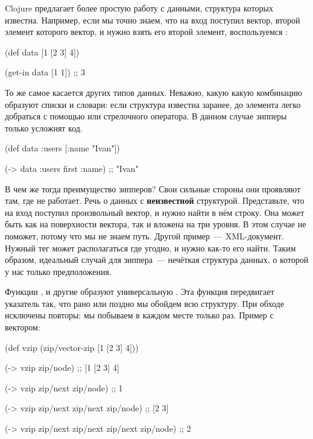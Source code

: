 Clojure предлагает более простую работу с данными, структура которых
известна. Например, если мы точно знаем, что на вход поступил вектор, второй
элемент которого вектор, и нужно взять его второй элемент, воспользуемся
:

\begin{english}
  \begin{clojure}
(def data [1 [2 3] 4])

(get-in data [1 1])
;; 3
  \end{clojure}
\end{english}

То же самое касается других типов данных. Неважно, какую какую комбинацию
образуют списки и словари: если структура известна заранее, до элемента легко
добраться с помощью  или стрелочного оператора. В данном случае зипперы
только усложнят код.

\begin{english}
  \begin{clojure}
(def data {:users [{:name "Ivan"}]})

(-> data :users first :name)
;; "Ivan"
  \end{clojure}
\end{english}

В чем же тогда преимущество зипперов? Свои сильные стороны они проявляют там,
где  не работает. Речь о данных с \textbf{неизвестной} структурой. Представьте,
что на вход поступил произвольный вектор, и нужно найти в нём строку. Она может
быть как на поверхности вектора, так и вложена на три уровня. В этом случае
 не поможет, потому что мы не знаем путь. Другой пример~---
XML-документ. Нужный тег может располагаться где угодно, и нужно как-то его
найти. Таким образом, идеальный случай для зиппера~--- нечёткая структура данных,
о которой у нас только предположения.

Функции ,  и другие образуют универсальную . Эта
функция передвигает указатель так, что рано или поздно мы обойдем всю
структуру. При обходе исключены повторы: мы побываем в каждом месте только
раз. Пример с вектором:

\begin{english}
  \begin{clojure}
(def vzip (zip/vector-zip [1 [2 3] 4]))

(-> vzip zip/node)
;; [1 [2 3] 4]

(-> vzip zip/next zip/node)
;; 1

(-> vzip zip/next zip/next zip/node)
;; [2 3]

(-> vzip zip/next zip/next zip/next zip/node)
;; 2
  \end{clojure}
\end{english}

